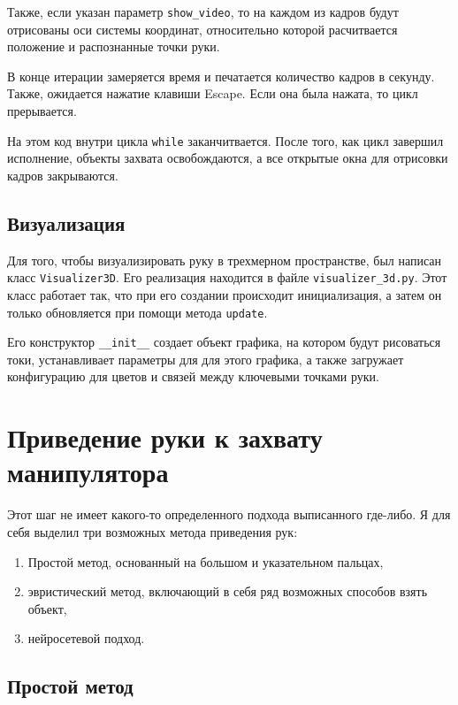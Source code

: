 \documentclass[12pt, a4paper]{article}
\begin{document}
Также, если указан параметр \texttt{show\_video}, то на каждом из кадров
будут отрисованы оси системы координат, относительно которой расчитвается
положение и распознанные точки руки.

В конце итерации замеряется время и печатается количество кадров в секунду.
Также, ожидается нажатие клавиши Escape. Если она была нажата, то цикл
прерывается.

На этом код внутри цикла \texttt{while} заканчитвается. После того, как цикл
завершил исполнение, объекты захвата освобождаются, а все открытые окна для
отрисовки кадров закрываются. 

\subsection{Визуализация}
Для того, чтобы визуализировать руку в трехмерном пространстве, был написан
класс \texttt{Visualizer3D}. Его реализация находится в файле
\texttt{visualizer\_3d.py}.
Этот класс работает так, что при его создании происходит инициализация, а
затем он только обновляется при помощи метода \texttt{update}.

Его конструктор \texttt{\_\_init\_\_} создает объект графика, на котором будут рисоваться токи, устанавливает параметры для для этого графика, а также загружает конфигурацию для цветов и связей между ключевыми точками руки.

\section{Приведение руки к захвату манипулятора}
Этот шаг не имеет какого-то определенного подхода выписанного где-либо. Я для
себя выделил три возможных метода приведения рук:
\begin{enumerate}
    \item Простой метод, основанный на большом и указательном пальцах,
    \item эвристический метод, включающий в себя ряд возможных способов взять
      объект,
    \item нейросетевой подход.
\end{enumerate}

\subsection{Простой метод}
\label{sec:gripper_basic_method}
\end{document}
